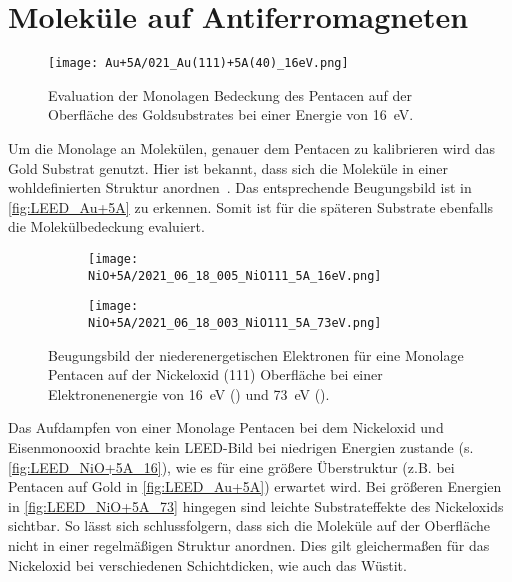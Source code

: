     \FloatBarrier
    \section{Moleküle auf Antiferromagneten} \label{sec:Ergeb}
        \begin{figure}
            \centering
            \texttt{[image: Au+5A/021\_Au(111)+5A(40)\_16eV.png]}
            \caption{Evaluation der Monolagen Bedeckung des Pentacen auf der Oberfläche des Goldsubstrates bei einer Energie von \SI{16}{\electronvolt}.}
            \label{fig:LEED_Au+5A}
        \end{figure}
        Um die Monolage an Molekülen, genauer dem Pentacen zu kalibrieren wird das Gold Substrat genutzt.
        Hier ist bekannt, dass sich die Moleküle in einer wohldefinierten Struktur anordnen~\cite{5A_4}.
        Das entsprechende Beugungsbild ist in \autoref{fig:LEED_Au+5A} zu erkennen.
        Somit ist für die späteren Substrate ebenfalls die Molekülbedeckung evaluiert.

        \begin{figure}
            \centering
            \begin{subfigure}[t]{0.48\textwidth}
                \centering
                \texttt{[image: NiO+5A/2021\_06\_18\_005\_NiO111\_5A\_16eV.png]}
                \subcaption{}
                \label{fig:LEED_NiO+5A_16}
            \end{subfigure}
            \begin{subfigure}[t]{0.48\textwidth}
                \centering
                \texttt{[image: NiO+5A/2021\_06\_18\_003\_NiO111\_5A\_73eV.png]}
                \subcaption{}
                \label{fig:LEED_NiO+5A_73}
            \end{subfigure}
            \caption{Beugungsbild der niederenergetischen Elektronen für eine Monolage Pentacen auf der Nickeloxid (111) Oberfläche bei einer Elektronenenergie von \SI{16}{\electronvolt} () und \SI{73}{\electronvolt} ().}
            \label{fig:LEED_NiO+5A}
        \end{figure}
        Das Aufdampfen von einer Monolage Pentacen bei dem Nickeloxid und Eisenmonooxid brachte kein LEED-Bild bei niedrigen Energien zustande (s. \autoref{fig:LEED_NiO+5A_16}), wie es für eine größere Überstruktur (z.B. bei Pentacen auf Gold in \autoref{fig:LEED_Au+5A}) erwartet wird.
        Bei größeren Energien in \autoref{fig:LEED_NiO+5A_73} hingegen sind leichte Substrateffekte des Nickeloxids sichtbar.
        So lässt sich schlussfolgern, dass sich die Moleküle auf der Oberfläche nicht in einer regelmäßigen Struktur anordnen.
        Dies gilt gleichermaßen für das Nickeloxid bei verschiedenen Schichtdicken, wie auch das Wüstit.

